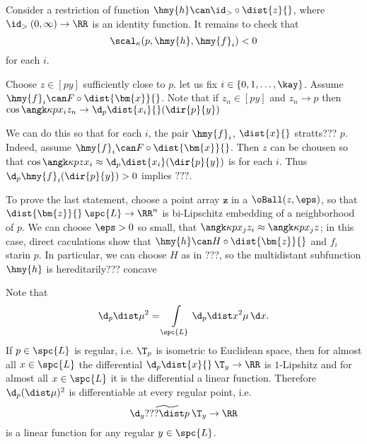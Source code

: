 Consider a restriction of function $\hmy{h}\can\id_>\circ\dist{z}{}$,
where $\id_>\:(0,\infty)\to\RR$ is an identity function.
It remains to check that
$$\scal_\kappa(p,\hmy{h},\hmy{f}_i)<0$$
for each $i$.




















Choose $z\in[py]$ sufficiently close to $p$.
let us fix $i\in \{0,1,\dots,\kay\}$.
Assume $\hmy{f}_i\can F\circ\dist{\bm{x}}{}$.
Note that if $z_n\in[py]$ 
and $z_n\to p$ 
then $\cos\angk\kappa p{x_i}{z_n}\to\d_p\dist{x_i}{}(\dir{p}{y})$

We can do this so that for each $i$, the pair $\hmy{f}_i$, $\dist{x}{}$ stratts??? $p$.
Indeed, assume 
$\hmy{f}_i\can
F\circ\dist{\bm{x}}{}$.
Then $z$ can be chousen so that $\cos\angk\kappa p z{x_i}\approx \d_p\dist{x_i}(\dir{p}{y})$ is for each $i$.
Thus $\d_p\hmy{f}_i(\dir{p}{y})>0$ implies $???$.

To prove the last statement, choose a point array $\bm{z}$ in a $\oBall(z,\eps)$,
so that $\dist{\bm{z}}{}\:\spc{L}\to\RR^n$ is bi-Lipschitz embedding of a neighborhood of $p$.
We can choose $\eps>0$ so small, that $\angk\kappa p{x_j}{z_i}\approx\angk\kappa p{x_j}{z}$;
in this case, direct caculations show that $\hmy{h}\can H\circ\dist{\bm{z}}{}$ and  $f_i$ starin $p$.
In particular, we can choose $H$ as in ???, so the multidistant subfunction $\hmy{h}$ is hereditarily??? concave















Note that 
$$\d_p\dist \mu^2=\int\limits_{\spc{L}}\d_p\dist x^2\mu\,\d x.$$
If $p\in \spc{L}$ is regular, i.e. $\T_p$ is isometric to Euclidean space, 
then for almost all $x\in \spc{L}$ the differential $\d_p\dist{x}{}\:\T_y\to\RR$ is $1$-Lipshitz and
for almost all $x\in \spc{L}$ it is the differential a linear function.
Therefore $\d_p(\dist \mu)^2$ is differentiable at every regular point, i.e.
$$\d_y\widetilde{???\dist p{}}\:\T_y\to\RR$$
is a linear function for any regular $y\in \spc{L}$.
\qeds


